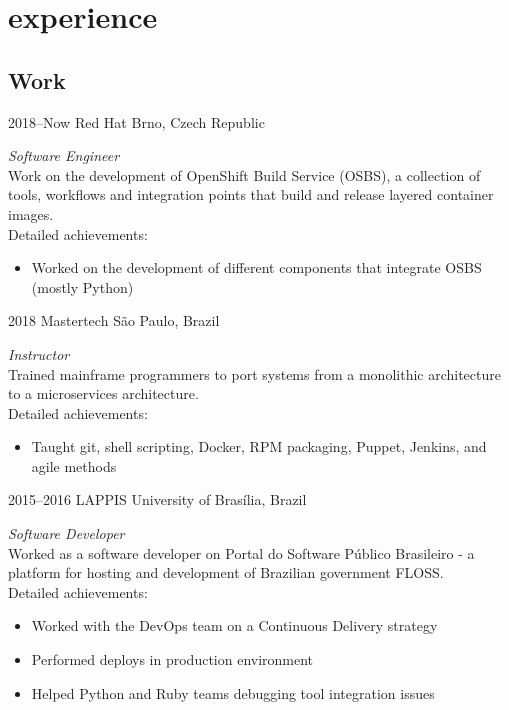\documentclass[print]{friggeri-cv}
\begin{document}

\section{experience}

\subsection{Work}

\begin{entrylist}

\entry
{2018--Now}
{Red Hat}
{Brno, Czech Republic}
{\emph{Software Engineer} \\
  Work on the development of OpenShift Build Service (OSBS), a collection of
  tools, workflows and integration points that build and release layered
  container images. \\
Detailed achievements:
\begin{itemize}
  \item Worked on the development of different components that integrate OSBS (mostly Python)
\end{itemize}
}

\entry
{2018}
{Mastertech}
{São Paulo, Brazil}
{\emph{Instructor} \\
  Trained mainframe programmers to port systems from a monolithic
  architecture to a microservices architecture. \\
Detailed achievements:
\begin{itemize}
  \item Taught git, shell scripting, Docker, RPM packaging, Puppet, Jenkins, and agile methods
\end{itemize}
}

\entry
{2015--2016}
{LAPPIS}
{University of Brasília, Brazil}
{\emph{Software Developer} \\
  Worked as a software developer on Portal do Software Público
  Brasileiro - a platform for hosting and development of Brazilian government
  FLOSS. \\
Detailed achievements:
\begin{itemize}
  \item Worked with the DevOps team on a Continuous Delivery strategy
  \item Performed deploys in production environment
  \item Helped Python and Ruby teams debugging tool integration issues
\end{itemize}
  }


\end{entrylist}
\end{document}
